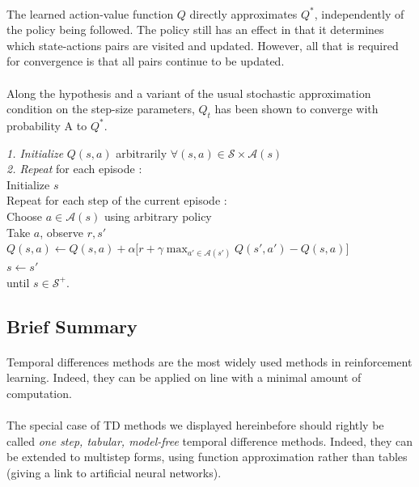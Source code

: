 \documentclass[a4paper]{article}
\begin{document}
{{{{					\paragraph{} The learned action-value function $Q$ directly approximates $Q^*$, independently of the policy being followed. The policy still has an effect in that it determines which state-actions pairs are visited and updated. However, all that is required for convergence is that all pairs continue to be updated. 
					
					\paragraph{} Along the hypothesis and a variant of the usual stochastic approximation condition on the step-size parameters, $Q_t$ has been shown to converge with probability A to $Q^*$. 
					
					\vspace{10pt}
					
					{
						\begin{algorithm}[H]
	 					\SetAlgoLined
						\LinesNumbered
						\emph{\textsf{1. Initialize}} $Q(s,a)$ arbitrarily $\forall (s,a)\in\mathcal{S}\times\mathcal{A}(s)$ \\
						\BlankLine
						\BlankLine
						\emph{\textsf{2. Repeat}} for each episode : \\
						\Indp \Indp 
							Initialize $s$ \\
							Repeat for each step of the current episode :   \\
							\Indp \Indp 
								Choose $a\in\mathcal{A}(s)$ using arbitrary policy \\
								Take $a$, observe $r,s'$ \\
								$ Q(s,a) \longleftarrow Q(s,a) + \alpha\big[ r + \gamma \max_{a'\in\mathcal{A}(s')}Q(s',a') - Q(s,a) \big]$ \\
								$s\leftarrow s' $ \\
								
							\Indm \Indm 
						until $s\in\mathcal{S}^+$.
						\Indm \Indm 
						\end{algorithm}
					}
				}
			}			
			\subsection{Brief Summary}
			{
				\paragraph{} Temporal differences methods are the most widely used methods in reinforcement learning. Indeed, they can be applied on line with a minimal amount of computation. 
				
				\paragraph{} The special case of TD methods we displayed hereinbefore should rightly be called \emph{one step, tabular, model-free} temporal difference methods. Indeed, they can be extended to multistep forms, using function approximation rather than tables (giving a link to artificial neural networks). 
			}
		}
	}	
	
\end{document}
